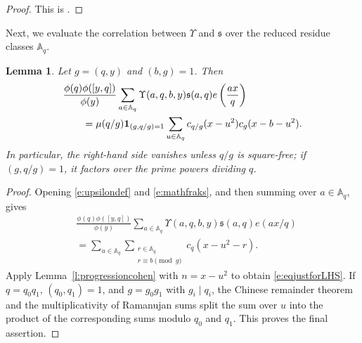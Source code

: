 \documentclass[12pt,reqno]{amsart}
\numberwithin{equation}{section}
\newtheorem{lemma}[equation]{Lemma}
\theoremstyle{definition}
\theoremstyle{remark}
\begin{document}
\begin{proof}
This is \cite[Lemma~11]{laceyprogression}.
\end{proof}

Next, we evaluate the correlation between $\Upsilon$ and $\mathfrak s$ over the reduced residue classes $\mathbb A_q$.
\begin{lemma}\label{l:sumoverramanujan}
Let $g=(q,y)$ and $(b,g)=1$.  Then
\begin{align}\label{e:eqjustforLHS}
 &\frac{\phi(q)\phi([y,q])}{\phi(y)}
 \sum_{a\in\mathbb A_q}\Upsilon(a,q,b,y)
 \mathfrak s(a,q)e\left(\frac{ax}{q}\right)\notag\\
 &\qquad=\mu(q/g)\mathbf1_{(g,q/g)=1}
 \sum_{u\in\mathbb A_q}c_{q/g}(x-u^2)c_g(x-b-u^2).
\end{align}
In particular, the right-hand side vanishes unless $q/g$ is square-free;
if $(g,q/g)=1$, it factors over the prime powers dividing $q$.
\end{lemma}

\begin{proof}
Opening \eqref{e:upsilondef} and \eqref{e:mathfraks}, and then summing
over $a\in\mathbb A_q$, gives
\begin{align*}
 &\frac{\phi(q)\phi([y,q])}{\phi(y)}
 \sum_{a\in\mathbb A_q}\Upsilon(a,q,b,y)
 \mathfrak s(a,q)e(ax/q)\\
 &=\sum_{u\in\mathbb A_q}
   \sum_{\substack{r\in\mathbb A_q\\r\equiv b\pmod g}}
   c_q(x-u^2-r).
\end{align*}
Apply Lemma~\ref{l:progressioncohen} with $n=x-u^2$ to obtain
\eqref{e:eqjustforLHS}.  If $q=q_0q_1$, $(q_0,q_1)=1$, and
$g=g_0g_1$ with $g_i\mid q_i$, the Chinese remainder theorem and the
multiplicativity of Ramanujan sums split the sum over $u$ into the
product of the corresponding sums modulo $q_0$ and $q_1$.  This proves
the final assertion.
\end{proof}
\end{document}
